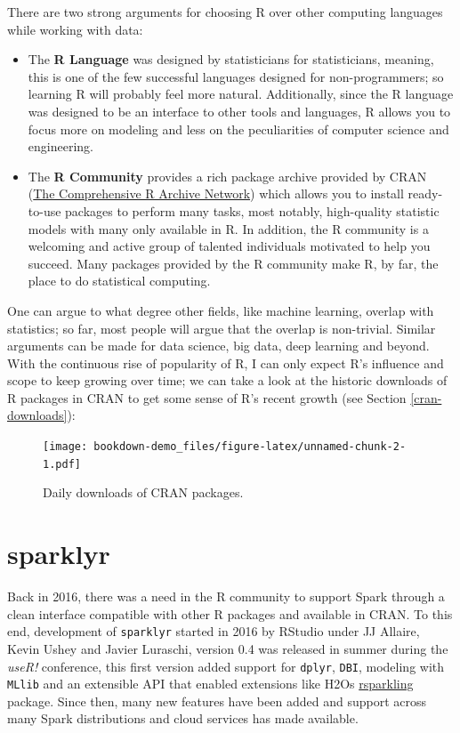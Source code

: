 \documentclass[]{book}
\providecommand{\tightlist}{%
  \setlength{\itemsep}{0pt}\setlength{\parskip}{0pt}}
\theoremstyle{definition}
\theoremstyle{definition}
\theoremstyle{definition}
\theoremstyle{remark}
\begin{document}
There are two strong arguments for choosing R over other computing
languages while working with data:

\begin{itemize}
\tightlist
\item
  The \textbf{R Language} was designed by statisticians for
  statisticians, meaning, this is one of the few successful languages
  designed for non-programmers; so learning R will probably feel more
  natural. Additionally, since the R language was designed to be an
  interface to other tools and languages, R allows you to focus more on
  modeling and less on the peculiarities of computer science and
  engineering.
\item
  The \textbf{R Community} provides a rich package archive provided by
  CRAN (\href{https://cran.r-project.org/}{The Comprehensive R Archive
  Network}) which allows you to install ready-to-use packages to perform
  many tasks, most notably, high-quality statistic models with many only
  available in R. In addition, the R community is a welcoming and active
  group of talented individuals motivated to help you succeed. Many
  packages provided by the R community make R, by far, the place to do
  statistical computing.
\end{itemize}

One can argue to what degree other fields, like machine learning,
overlap with statistics; so far, most people will argue that the overlap
is non-trivial. Similar arguments can be made for data science, big
data, deep learning and beyond. With the continuous rise of popularity
of R, I can only expect R's influence and scope to keep growing over
time; we can take a look at the historic downloads of R packages in CRAN
to get some sense of R's recent growth (see Section
\ref{cran-downloads}):

\begin{figure}
\centering
\texttt{[image: bookdown-demo\_files/figure-latex/unnamed-chunk-2-1.pdf]}
\caption{\label{fig:unnamed-chunk-2}Daily downloads of CRAN packages.}
\end{figure}

\section{sparklyr}\label{sparklyr}

Back in 2016, there was a need in the R community to support Spark
through a clean interface compatible with other R packages and available
in CRAN. To this end, development of \texttt{sparklyr} started in 2016
by RStudio under JJ Allaire, Kevin Ushey and Javier Luraschi, version
0.4 was released in summer during the \emph{useR!} conference, this
first version added support for \texttt{dplyr}, \texttt{DBI}, modeling
with \texttt{MLlib} and an extensible API that enabled extensions like
H2Os \href{https://github.com/h2oai/rsparkling/}{rsparkling} package.
Since then, many new features have been added and support across many
Spark distributions and cloud services has made available.
\end{document}
